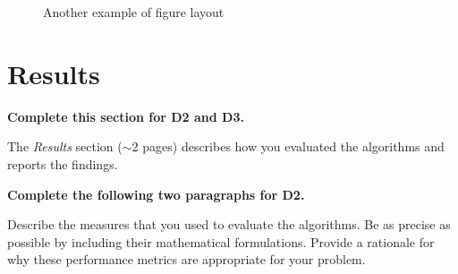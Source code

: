 \documentclass[letterpaper]{article} %
\begin{document}
\begin{figure}[t!]
\centering
{}\hfill
{}\hfill
{}\hfill
{}\hfill
\caption{Another example of figure layout}
\label{fig:figures_across}
\end{figure}


\section{Results}

{\bf Complete this section for D2 and D3.}

The {\it Results} section ($\sim$2 pages) describes how you evaluated the algorithms and reports the findings.  

{\bf Complete the following two paragraphs for D2.}

Describe the measures that you used to evaluate the algorithms.  Be as precise as possible by including their mathematical formulations.  Provide a rationale for why these performance metrics are appropriate for your problem.
\end{document}
